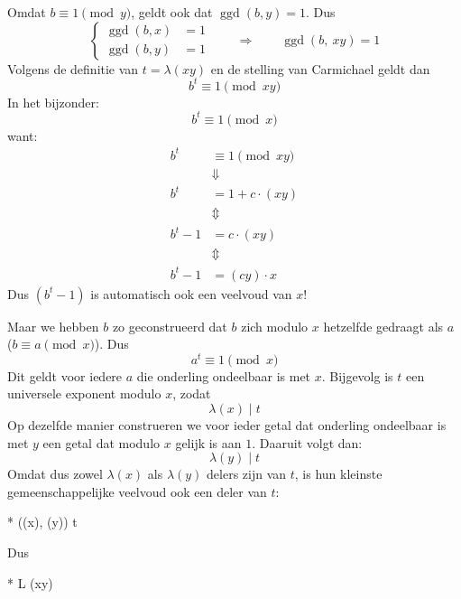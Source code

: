 Omdat $b \equiv 1 \pmod y$, geldt ook dat $\operatorname{ggd}(b, y) = 1$. Dus
\begin{equation*}
    \begin{cases}
        \operatorname{ggd}(b, x) &= 1 \\
        \operatorname{ggd}(b, y) &= 1
    \end{cases}\qquad \Longrightarrow \qquad \operatorname{ggd}(b,\ xy) = 1
\end{equation*}
Volgens de definitie van $t = \lambda(xy)$ en de stelling van Carmichael geldt dan
\begin{equation*}
    b^t \equiv 1 \pmod {xy}
\end{equation*}
In het bijzonder:
\begin{equation*}
    b^t \equiv 1 \pmod x
\end{equation*}
want:
\begin{equation*}
    \begin{aligned}
        b^t &\equiv 1 \pmod {xy} \\
        &\Downarrow \\
        b^t &= 1 + c \cdot (xy) \\
        &\Updownarrow \\
        b^t - 1 &= c \cdot (xy) \\
        &\Updownarrow \\
        b^t - 1 &= (cy) \cdot x
    \end{aligned}
\end{equation*}
Dus $(b^t-1)$ is automatisch ook een veelvoud van $x$!

Maar we hebben $b$ zo geconstrueerd dat $b$ zich modulo $x$ hetzelfde gedraagt als $a$ ($b \equiv a \pmod x$). Dus
\begin{equation*}
    a^t \equiv 1 \pmod x
\end{equation*}
Dit geldt voor iedere $a$ die onderling ondeelbaar is met $x$. Bijgevolg is $t$ een universele exponent modulo $x$, zodat
\begin{equation*}
    \lambda(x) \mid t
\end{equation*}
Op dezelfde manier construeren we voor ieder getal dat onderling ondeelbaar is met $y$ een getal dat modulo $x$ gelijk is aan $1$. Daaruit volgt dan:
\begin{equation*}
    \lambda(y) \mid t
\end{equation*}
Omdat dus zowel $\lambda(x)$ als $\lambda(y)$ delers zijn van $t$, is hun kleinste gemeenschappelijke veelvoud ook een deler van $t$:
\begin{equationbox}*
    \left(\lambda(x), \lambda(y)\right) \mid t 
\end{equationbox}
Dus
\begin{equationbox}*
    L \mid \lambda(xy)
\end{equationbox}

